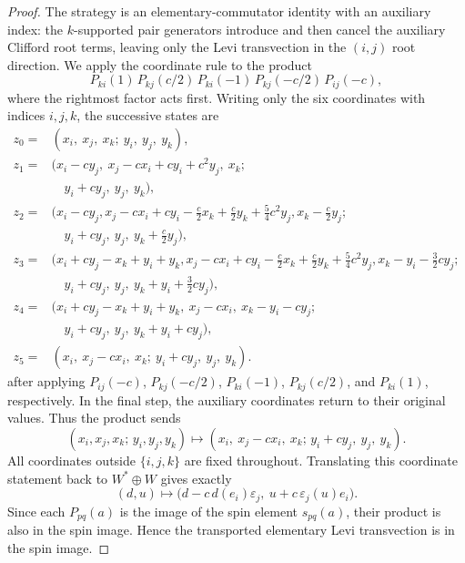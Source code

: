 \documentclass{birkjour}
\theoremstyle{plain}
\theoremstyle{definition}
\theoremstyle{remark}
\numberwithin{equation}{section}
\begin{document}
\begin{proof}
The strategy is an elementary-commutator identity with an auxiliary index:
the \(k\)-supported pair generators introduce and then cancel the
auxiliary Clifford root terms, leaving only the
Levi transvection in the \((i,j)\) root direction. We apply the coordinate rule to
the product
\[
  P_{ki}(1)\,P_{kj}(c/2)\,P_{ki}(-1)\,P_{kj}(-c/2)\,P_{ij}(-c),
\]
where the rightmost factor acts first. Writing only the six coordinates with
indices \(i,j,k\), the successive states are
\begingroup
\small
\[
\begin{aligned}
z_0={}&(x_i,\ x_j,\ x_k;\ y_i,\ y_j,\ y_k),\\
z_1={}&(x_i-cy_j,\ x_j-cx_i+cy_i+c^2y_j,\ x_k;\\
&\quad y_i+cy_j,\ y_j,\ y_k),\\
z_2={}&(x_i-cy_j,
  x_j-cx_i+cy_i-\tfrac c2x_k+\tfrac c2y_k+\tfrac54c^2y_j,
  x_k-\tfrac c2y_j;\\
&\quad y_i+cy_j,\ y_j,\ y_k+\tfrac c2y_j),\\
z_3={}&(x_i+cy_j-x_k+y_i+y_k,
  x_j-cx_i+cy_i-\tfrac c2x_k+\tfrac c2y_k+\tfrac54c^2y_j,
  x_k-y_i-\tfrac32cy_j;\\
&\quad y_i+cy_j,\ y_j,\ y_k+y_i+\tfrac32cy_j),\\
z_4={}&(x_i+cy_j-x_k+y_i+y_k,\ x_j-cx_i,\ x_k-y_i-cy_j;\\
&\quad y_i+cy_j,\ y_j,\ y_k+y_i+cy_j),\\
z_5={}&(x_i,\ x_j-cx_i,\ x_k;\ y_i+cy_j,\ y_j,\ y_k).
\end{aligned}
\]
\endgroup
after applying \(P_{ij}(-c)\), \(P_{kj}(-c/2)\), \(P_{ki}(-1)\),
\(P_{kj}(c/2)\), and \(P_{ki}(1)\), respectively. In the final step, the
auxiliary coordinates return to their original values.
Thus the product sends
\[
 (x_i,x_j,x_k;\,y_i,y_j,y_k)
 \longmapsto
 (x_i,\ x_j-cx_i,\ x_k;\, y_i+cy_j,\ y_j,\ y_k).
\]
All coordinates outside \(\{i,j,k\}\) are fixed throughout. Translating this
coordinate statement back to \(W^*\oplus W\) gives exactly
\[
  (d,u)\longmapsto
  \bigl(d-c\,d(e_i)\varepsilon_j,\ u+c\,\varepsilon_j(u)e_i\bigr).
\]
Since each \(P_{pq}(a)\) is the image of the spin element \(s_{pq}(a)\), their
product is also in the spin image. Hence the transported elementary Levi
transvection is in the spin image.
\end{proof}
\end{document}
